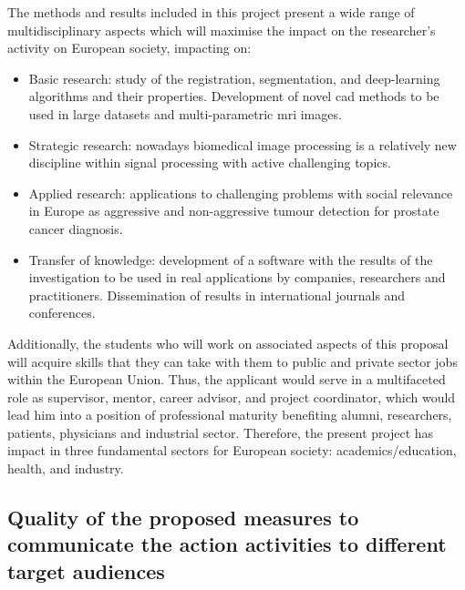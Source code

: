 The methods and results included in this project present a wide range of multidisciplinary aspects which will maximise the impact on the researcher's activity on European society, impacting on:
\begin{itemize}[noitemsep]
\item Basic research: study of the registration, segmentation, and deep-learning algorithms and their properties.
Development of novel \ac{cad} methods to be used in large datasets and multi-parametric \ac{mri} images.
\item Strategic research: nowadays biomedical image processing is a relatively new discipline within signal processing with active challenging topics.
\item Applied research: applications to challenging problems with social relevance in Europe as aggressive and non-aggressive tumour detection for prostate cancer diagnosis.
\item Transfer of knowledge: development of a software with the results of the investigation to be used in real applications by companies, researchers and practitioners.
Dissemination of results in international journals and conferences.
\end{itemize}

Additionally, the students who will work on associated aspects of this proposal will acquire skills that they can take with them to public and private sector jobs within the European Union. 
Thus, the applicant would serve in a multifaceted role as supervisor, mentor, career advisor, and project coordinator, which would lead him into a position of professional maturity benefiting alumni, researchers, patients, physicians and industrial sector.
Therefore, the present project has impact in three fundamental sectors for European society: academics/education, health, and industry.

\subsection{Quality of the proposed measures to communicate the action activities to different target audiences}

